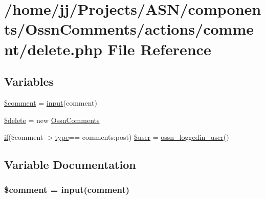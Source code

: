 \hypertarget{components_2_ossn_comments_2actions_2comment_2delete_8php}{}\section{/home/jj/\+Projects/\+A\+S\+N/components/\+Ossn\+Comments/actions/comment/delete.php File Reference}
\label{components_2_ossn_comments_2actions_2comment_2delete_8php}
\subsection*{Variables}
\begin{DoxyCompactItemize}
\item 
\hyperlink{components_2_ossn_comments_2actions_2comment_2delete_8php_a536677acc0163c53c067316a97456e6c}{\$comment} = \hyperlink{ossn_8lib_8input_8php_a64ebee98b041c4f75f71ed3cd73cc8ed}{input}(\textquotesingle{}comment\textquotesingle{})
\item 
\hyperlink{components_2_ossn_comments_2actions_2comment_2delete_8php_aba2374a8b713514611e21494ec2fef8d}{\$delete} = new \hyperlink{class_ossn_comments}{Ossn\+Comments}
\item 
\hyperlink{jquery_8tokeninput_8js_ad8dd46a3cbc004569e34401e9e71771a}{if}(\$comment-\/$>$\hyperlink{_ossn_wall_2actions_2wall_2post_2group_8php_a2dc1bb4e1ed0029daa81ac0776b14b51}{type}== \textquotesingle{}comments\+:post\textquotesingle{}) \hyperlink{components_2_ossn_comments_2actions_2comment_2delete_8php_a7945a6803175e296f6af77f90b130253}{\$user} = \hyperlink{ossn_8lib_8users_8php_aa3c8068d0e6638b414d6a2f6c62565b8}{ossn\+\_\+loggedin\+\_\+user}()
\end{DoxyCompactItemize}


\subsection{Variable Documentation}
\subsubsection[{\texorpdfstring{\$comment}{$comment}}]{\setlength{\rightskip}{0pt plus 5cm}\$comment = {\bf input}(\textquotesingle{}comment\textquotesingle{})}\hypertarget{components_2_ossn_comments_2actions_2comment_2delete_8php_a536677acc0163c53c067316a97456e6c}{}\label{components_2_ossn_comments_2actions_2comment_2delete_8php_a536677acc0163c53c067316a97456e6c}


